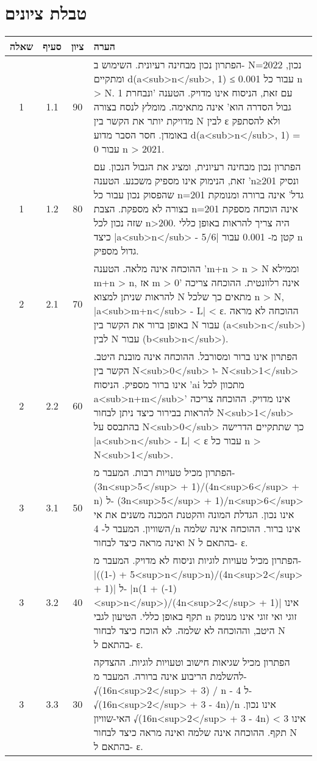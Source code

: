 \documentclass{article}
\begin{document}
\section*{טבלת ציונים}
\begin{RTL}
\begin{tabular}{|c|c|c|p{10cm}|}
\hline
שאלה & סעיף & ציון & הערה \\
\hline
1 & 1.1 & 90 & הפתרון נכון מבחינה רעיונית.  השימוש ב- N=2022 נכון, ומתקיים d(a<sub>n</sub>, 1) ≤ 0.001 עבור כל n > N. עם זאת,  הניסוח אינו מדויק.  הטענה 'ונבחרת 1 גבול הסדרה הוא' אינה מתאימה.  מומלץ לנסח בצורה מדויקת יותר את  הקשר בין  N לבין  ε  ולא להסתפק באומדן.  חסר הסבר מדוע  d(a<sub>n</sub>, 1) = 0  עבור n > 2021. \\ \hline
1 & 1.2 & 80 & הפתרון נכון מבחינה רעיונית, ומציג את הגבול הנכון.  עם זאת, הנימוק אינו מספיק משכנע.  הטענה 'n≥201 ונסיק שהפסוק נכון עבור כל n=201 גדל' אינה ברורה ומנומקת בצורה לא מספקת.  הצבת n=201 אינה הוכחה מספקת שזה נכון לכל n>200.  היה צריך להראות  באופן כללי כיצד  |a<sub>n</sub> - 5/6| קטן מ- 0.001  עבור n גדול מספיק. \\ \hline
2 & 2.1 & 70 & ההוכחה אינה מלאה.  הטענה 'm+n > n > N וממילא m+n > n, אז m > 0' אינה רלוונטית.  ההוכחה צריכה להראות שניתן למצוא N  מתאים כך שלכל n > N,  |a<sub>m+n</sub> - L| < ε.  ההוכחה לא מראה באופן ברור את הקשר בין N  עבור  (a<sub>n</sub>) לבין N  עבור  (b<sub>n</sub>). \\ \hline
2 & 2.2 & 60 & הפתרון אינו ברור ומסורבל.  ההוכחה אינה מובנת היטב.  הקשר בין N<sub>0</sub> ו- N<sub>1</sub> אינו ברור מספיק.  הניסוח  'ai מתכוון לכל a<sub>n+m</sub>' אינו מדויק.   ההוכחה צריכה להראות בבירור כיצד ניתן לבחור N<sub>1</sub>  בהתבסס על  N<sub>0</sub>  כך שתתקיים הדרישה  |a<sub>n</sub> - L| < ε  עבור כל n > N<sub>1</sub>. \\ \hline
3 & 3.1 & 50 & הפתרון מכיל טעויות רבות.  המעבר מ- (3n<sup>5</sup> + 1)/(4n<sup>6</sup> + n) ל- (3n<sup>5</sup> + 1)/n<sup>6</sup>  אינו נכון.  הגדלת המונה והקטנת המכנה משנים את אי השוויון.   המעבר ל- 4/n  אינו ברור.  ההוכחה אינה שלמה ואינה מראה כיצד לבחור N  בהתאם ל- ε. \\ \hline
3 & 3.2 & 40 & הפתרון מכיל טעויות לוגיות וניסוח לא מדויק.  המעבר מ- |(5 + (-1)<sup>n</sup>n)/(4n<sup>2</sup> + 1)|  ל- |n(1 + (-1)<sup>n</sup>)/(4n<sup>2</sup> + 1)| אינו תקף באופן כללי.  הטיעון לגבי n זוגי ואי זוגי אינו מנומק היטב, וההוכחה לא שלמה.  לא הוכח כיצד לבחור N  בהתאם ל- ε. \\ \hline
3 & 3.3 & 30 & הפתרון מכיל שגיאות חישוב וטעויות לוגיות.  ההצדקה להשלמת הריבוע אינה ברורה.  המעבר מ- √(16n<sup>2</sup> + 3) / n - 4  ל-  √(16n<sup>2</sup> + 3 - 4n)/n אינו נכון.  האי-שוויון  √(16n<sup>2</sup> + 3 - 4n) < 3  אינו תקף.  ההוכחה אינה שלמה ואינה מראה כיצד לבחור N בהתאם ל- ε. \\ \hline

\end{tabular}
\end{RTL}
\end{document}
